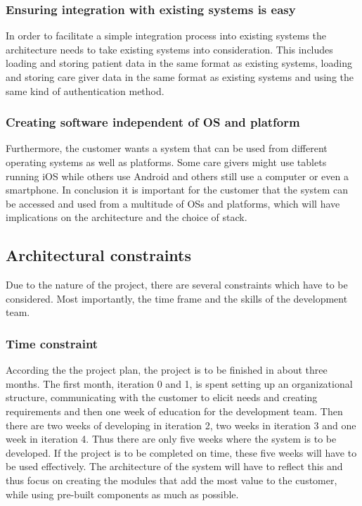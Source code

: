 \documentclass{article}
\begin{document}
\subsubsection{Ensuring integration with existing systems is easy}
In order to facilitate a simple integration process into existing systems the architecture needs to take existing systems into consideration. This includes loading and storing patient data in the same format as existing systems, loading and storing care giver data in the same format as existing systems and using the same kind of authentication method.

\subsubsection{Creating software independent of OS and platform}
Furthermore, the customer wants a system that can be used from different operating systems as well as platforms. Some care givers might use tablets running iOS while others use Android and others still use a computer or even a smartphone. In conclusion it is important for the customer that the system can be accessed and used from a multitude of OSs and platforms, which will have implications on the architecture and the choice of stack. 



\subsection{Architectural constraints}
Due to the nature of the project, there are several constraints which have to be considered. Most importantly, the time frame and the skills of the development team.

\subsubsection{Time constraint}
According the the project plan, the project is to be finished in about three months. The first month, iteration 0 and 1, is spent setting up an organizational structure, communicating with the customer to elicit needs and creating requirements and then one week of education for the development team. Then there are two weeks of developing in iteration 2, two weeks in iteration 3 and one week in iteration 4. 
Thus there are only five weeks where the system is to be developed. If the project is to be completed on time, these five weeks will have to be used effectively. The architecture of the system will have to reflect this and thus focus on creating the modules that add the most value to the customer, while using pre-built components as much as possible.
\end{document}
